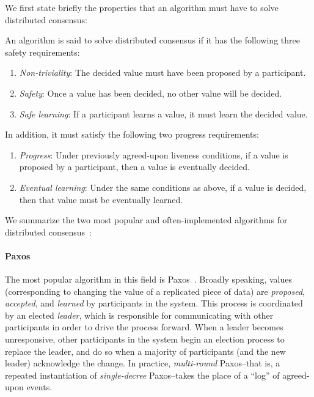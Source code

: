 We first state briefly the properties that an algorithm must have to solve
distributed consensus:
\begin{definition}
  \label{def:consensus}
  An algorithm is said to solve distributed consensus if it has the following
  three safety requirements:
  \begin{enumerate}
    \item \emph{Non-triviality}: The decided value must have been proposed by a
      participant.
    \item \emph{Safety}: Once a value has been decided, no other value will be
      decided.
    \item \emph{Safe learning}: If a participant learns a value, it must learn
      the decided value.
  \end{enumerate}
  In addition, it must satisfy the following two progress requirements:
  \begin{enumerate}
    \item \emph{Progress}: Under previously agreed-upon liveness conditions, if
      a value is proposed by a participant, then a value is eventually decided.
    \item \emph{Eventual learning}: Under the same conditions as above, if a
      value is decided, then that value must be eventually learned.
  \end{enumerate}
\end{definition}

We summarize the two most popular and often-implemented algorithms for
distributed consensus~\citep{howard20}:

\paragraph{Paxos}
The most popular algorithm in this field is Paxos~\citep{lamport98}. Broadly
speaking, values (corresponding to changing the value of a replicated piece of
data) are \textit{proposed}, \textit{accepted}, and \textit{learned} by
participants in the system. This process is coordinated by an elected
\textit{leader}, which is responsible for communicating with other participants
in order to drive the process forward. When a leader becomes unresponsive, other
participants in the system begin an election process to replace the leader, and
do so when a majority of participants (and the new leader) acknowledge the
change. In practice, \emph{multi-round} Paxos--that is, a repeated instantiation
of \emph{single-decree} Paxos--takes the place of a ``log'' of agreed-upon
events.


